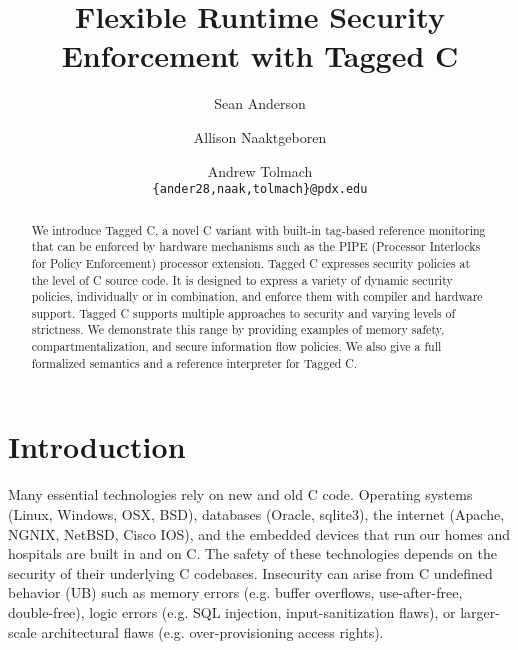 \documentclass{llncs}
\title{Flexible Runtime Security Enforcement with Tagged C}
\author{Sean Anderson \and Allison Naaktgeboren \and Andrew Tolmach\\
{\tt\{ander28,naak,tolmach\}@pdx.edu}}
\institute{Portland State University\\
Portland, OR, USA}
\begin{document}





\maketitle

\begin{abstract}
We introduce Tagged C, a novel C variant with
built-in tag-based reference monitoring that can be enforced by hardware
mechanisms such as the PIPE (Processor Interlocks for Policy Enforcement) processor extension.
Tagged C expresses security policies at the level of C source code.
It is designed to express a variety of dynamic security policies,  
individually or in combination, and enforce them with compiler and hardware support.
Tagged C supports multiple approaches to security and varying levels of strictness. We demonstrate
this range by providing examples of memory safety, compartmentalization,
and secure information flow policies. We also give a full formalized semantics
and a reference interpreter for Tagged C.
\end{abstract}

\section{Introduction}
Many essential technologies rely on new and old C code.
Operating systems (Linux, Windows, OSX, BSD), databases (Oracle, sqlite3), the internet
(Apache, NGNIX, NetBSD, Cisco IOS), and the 
embedded devices that run our homes and hospitals are built in and on C. %
The safety of these technologies
depends on the security of their underlying C codebases.
Insecurity can arise from C
undefined behavior (UB) such as memory errors (e.g. buffer overflows, use-after-free, double-free),
logic errors (e.g. SQL injection, input-sanitization flaws), or
larger-scale architectural flaws (e.g. over-provisioning access rights).
\end{document}
